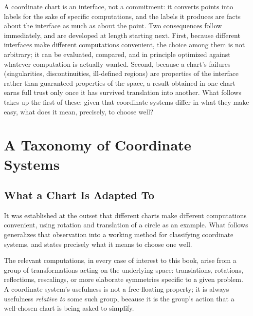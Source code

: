 \documentclass[11pt,fleqn]{book}
\numberwithin{equation}{chapter}
\theoremstyle{plain}
\theoremstyle{definition}
\theoremstyle{remark}
\providecommand{\enquote}[1]{``#1''}
\begin{document}
A coordinate chart is an interface, not a commitment: it converts points into labels for the sake of specific computations, and the labels it produces are facts about the interface as much as about the point. Two consequences follow immediately, and are developed at length starting next. First, because different interfaces make different computations convenient, the choice among them is not arbitrary; it can be evaluated, compared, and in principle optimized against whatever computation is actually wanted. Second, because a chart's failures (singularities, discontinuities, ill-defined regions) are properties of the interface rather than guaranteed properties of the space, a result obtained in one chart earns full trust only once it has survived translation into another. What follows takes up the first of these: given that coordinate systems differ in what they make easy, what does it mean, precisely, to choose well?


\providecommand{\enquote}[1]{``#1''}

\chapter{A Taxonomy of Coordinate Systems}

\section{What a Chart Is Adapted To}

It was established at the outset that different charts make different computations convenient, using rotation and translation of a circle as an example. What follows generalizes that observation into a working method for classifying coordinate systems, and states precisely what it means to choose one well.

The relevant computations, in every case of interest to this book, arise from a group of transformations acting on the underlying space: translations, rotations, reflections, rescalings, or more elaborate symmetries specific to a given problem. A coordinate system's usefulness is not a free-floating property; it is always usefulness \emph{relative to} some such group, because it is the group's action that a well-chosen chart is being asked to simplify.
\end{document}
